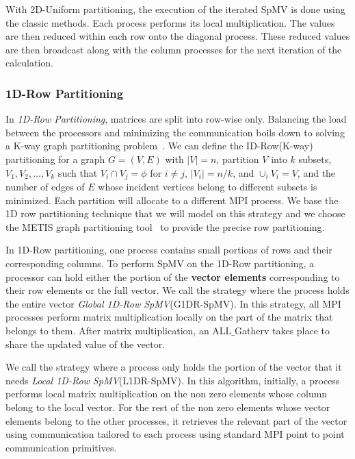 \documentclass[sigconf,review,anonymous]{acmart}
\begin{document}
With 2D-Uniform partitioning, the execution of the iterated SpMV is
done using the classic methods. Each process performs its local
multiplication. The values are then reduced within each row onto the
diagonal process. These reduced values are then broadcast along with the
column processes for the next iteration of the calculation.

\subsubsection{1D-Row Partitioning}

In \textit{1D-Row Partitioning}, matrices are split into row-wise
only. Balancing the load between the processors and minimizing the
communication boils down to solving a K-way graph partitioning
problem~\cite{kaya2013analysis}.  We can define the ID-Row(K-way)
partitioning for a graph $G=(V,E)$ with $|V|=n$, partition $V$ into
$k$ subsets, $V_1, V_2, \dots, V_k$ such that $V_i \cap V_j=\phi$ for
$i\neq j$, $|V_i| = n/k$, and $\cup_i V_i = V$, and the number of
edges of $E$ whose incident vertices belong to different subsets is
minimized. Each partition will allocate to a different MPI
process. We base the 1D row partitioning technique that we will model
on this strategy and we choose the METIS graph partitioning
tool~\cite{karypis1995multilevel} to provide the precise row
partitioning.

In 1D-Row partitioning, one process contains small portions of rows
and their corresponding columns. To perform SpMV on the 1D-Row
partitioning, a processor can hold either the portion of the \textbf{vector
  elements} corresponding to their row elements or the full vector.
We call the strategy where the process holds the entire vector \textit{Global
  1D-Row SpMV}(G1DR-SpMV). In this strategy, all MPI processes
perform matrix multiplication locally on the part of the matrix that
belongs to them. After matrix multiplication, an ALL$\_$Gatherv takes
place to share the updated value of the vector.

We call the strategy where a process only holds the portion of the
vector that it needs \textit{Local 1D-Row SpMV}(L1DR-SpMV).  In this
algorithm, initially, a process performs local matrix multiplication
on the non zero elements whose column belong to the local vector.  For
the rest of the non zero elements whose vector elements belong to the
other processes, it retrieves the relevant part of the vector using
communication tailored to each process using standard MPI point to
point communication primitives.
\end{document}
